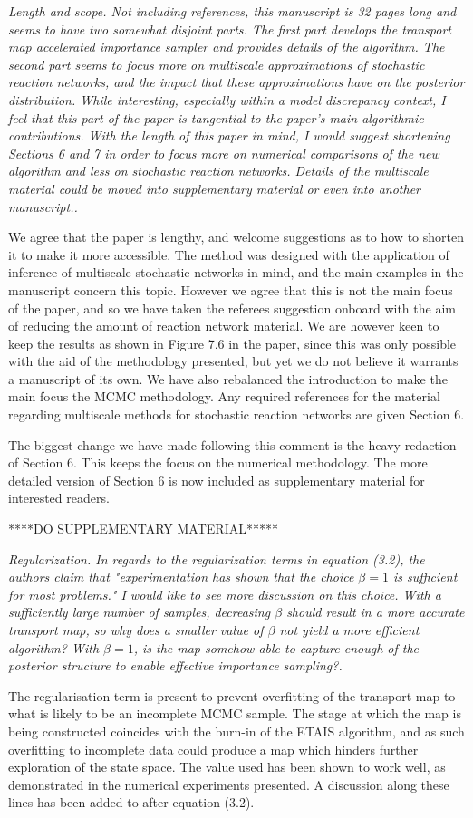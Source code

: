 \documentclass{article}
\newcommand{\comment}[2]{\vspace{0.6cm}{\bf Comment:} {\it #1.}

\vspace{0.3cm}{\bf Answer:} #2}
\begin{document}
\comment{Length and scope. Not including references, this manuscript is 32 pages long and seems to have two somewhat disjoint parts. The first part develops the transport map accelerated importance sampler and provides details of the algorithm. The second part seems to focus more on multiscale approximations of stochastic reaction networks, and the impact that these approximations have on the posterior distribution. While interesting, especially within a model discrepancy context, I feel that this part of the paper is tangential to the paper's main algorithmic contributions. With the length of this paper in mind, I would suggest shortening Sections 6 and 7 in order to focus more on numerical comparisons of the new algorithm and less on stochastic reaction networks. Details of the multiscale material could be moved into supplementary material or even into another manuscript.}{We agree that the paper is lengthy, and welcome suggestions as to how to shorten it to make it more accessible. The method was designed with the application of inference of multiscale stochastic networks in mind, and the main examples in the manuscript concern this topic. However we agree that this is not the main focus of the paper, and so we have taken the referees suggestion onboard with the aim of reducing the amount of reaction network material. We are however keen to keep the results as shown in Figure 7.6 in the paper, since this was only possible with the aid of the methodology presented, but yet we do not believe it warrants a manuscript of its own. We have also rebalanced the introduction to make the main focus the MCMC methodology. Any required references for the material regarding multiscale methods for stochastic reaction networks are given Section 6.

The biggest change we have made following this comment is the heavy redaction of Section 6. This keeps the focus on the numerical methodology. The more detailed version of Section 6 is now included as supplementary material for interested readers.}

****DO SUPPLEMENTARY MATERIAL*****


\comment{Regularization. In regards to the regularization terms in equation (3.2), the authors claim that "experimentation has shown that the choice $\beta=1$ is sufficient for most problems." I would like to see more discussion on this choice. With a sufficiently large number of samples, decreasing $\beta$ should result in a more accurate transport map, so why does a smaller value of $\beta$ not yield a more efficient algorithm? With $\beta=1$, is the map somehow able to capture enough of the posterior structure to enable effective importance sampling?}{The regularisation term is present to prevent overfitting of the transport map to what is likely to be an incomplete MCMC sample. The stage at which the map is being constructed coincides with the burn-in of the ETAIS algorithm, and as such overfitting to incomplete data could produce a map which hinders further exploration of the state space. The value used has been shown to work well, as demonstrated in the numerical experiments presented. A discussion along these lines has been added to after equation (3.2).}
\end{document}
